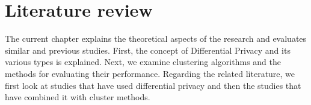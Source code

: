 \chapter{Literature review}
The current chapter explains the theoretical aspects of the research and evaluates similar and previous studies.
First, the concept of Differential Privacy and its various types is explained.
Next, we examine clustering algorithms and the methods for evaluating their performance.
Regarding the related literature, we first look at studies that have used differential privacy and then the studies that have combined it with cluster methods.




